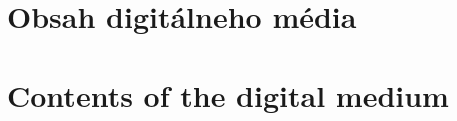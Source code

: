 \thispagestyle{empty}

\ifx\FIITlagEN\undefined
\chapter{Obsah digitálneho média}
\else
\chapter{Contents of the digital medium}
\fi

\renewcommand*{\thepage}{C-\arabic{page}}